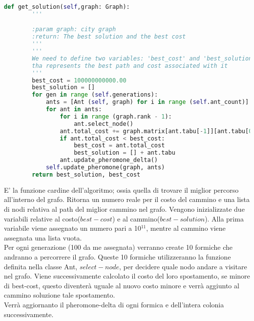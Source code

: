 \documentclass[a4paper,12pt]{report}
\begin{document}
\begin{lstlisting}[language=Python]
    def get_solution(self,graph: Graph):
        '''

        :param graph: city graph
        :return: The best solution and the best cost
        '''
        '''
        We need to define two variables: 'best_cost' and 'best_solution'
        tha represents the best path and cost associated with it 
        '''
        best_cost = 100000000000.00
        best_solution = []
        for gen in range (self.generations):
            ants = [Ant (self, graph) for i in range (self.ant_count)]
            for ant in ants:
                for i in range (graph.rank - 1):
                    ant.select_node()
                ant.total_cost += graph.matrix[ant.tabu[-1]][ant.tabu[0]]
                if ant.total_cost < best_cost:
                    best_cost = ant.total_cost
                    best_solution = [] + ant.tabu
                ant.update_pheromone_delta()
            self.update_pheromone(graph, ants)
        return best_solution, best_cost
\end{lstlisting}
E' la funzione cardine dell'algoritmo; ossia quella di trovare il miglior percorso all'interno del grafo.
Ritorna un numero reale per il costo del cammino e una lista di nodi relativa al path del miglior cammino nel grafo.
Vengono inizializzate due variabili relative al costo($best-cost$) e al cammino($best-solution$). Alla prima variabile viene assegnato un numero pari a 10$^{11}$, mentre al cammino viene assegnata una lista vuota.\\
Per ogni generazione (100 da me assegnata) verranno create 10 formiche che andranno a percorrere il grafo. Queste 10 formiche utilizzeranno la funzione definita nella classe Ant, $select-node$, per decidere quale nodo andare a visitare nel grafo. Viene successivamente calcolato il costo del loro spostamento, se minore di best-cost, questo diventerà uguale al nuovo costo minore e verrà aggiunto al cammino soluzione tale spostamento.\\
Verrà aggiornanto il pheromone-delta di ogni formica e dell'intera colonia successivamente.\\
\end{document}
